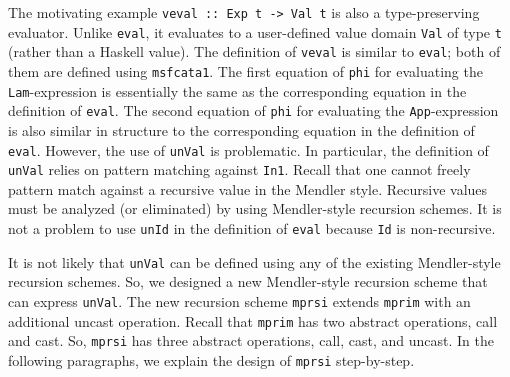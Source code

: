 \begin{figure}

\vspace*{-3ex}
\end{figure}

The motivating example \lstinline{veval :: Exp t -> Val t} is also 
a type-preserving evaluator. Unlike \lstinline{eval}, it evaluates to 
a user-defined value domain \lstinline{Val} of type \lstinline{t} (rather
than a Haskell value). The definition of \lstinline{veval} is similar to
\lstinline{eval}; both of them are defined using \lstinline{msfcata1}.
The first equation of \lstinline{phi} for evaluating
the \lstinline{Lam}-expression is essentially the same as
the corresponding equation in the definition of \lstinline{eval}.
The second equation of \lstinline{phi} for evaluating
the \lstinline{App}-expression is also similar in structure to
the corresponding equation in the definition of \lstinline{eval}.
However, the use of \lstinline{unVal} is problematic. In particular,
the definition of \lstinline{unVal} relies on pattern matching against
\lstinline{In1}. Recall that one cannot freely pattern match against
a recursive value in the Mendler style. Recursive values must be analyzed
(or eliminated) by using Mendler-style recursion schemes. It is not a problem
to use \lstinline{unId} in the definition of \lstinline{eval} because
\lstinline{Id} is non-recursive.

It is not likely that \lstinline{unVal} can be defined using any of
the existing Mendler-style recursion schemes. So, we designed
a new Mendler-style recursion scheme that can express \lstinline{unVal}.
The new recursion scheme \lstinline{mprsi} extends \lstinline{mprim} with
an additional uncast operation. Recall that \lstinline{mprim} has
two abstract operations, call and cast. So, \lstinline{mprsi} has
three abstract operations, call, cast, and uncast. In the following paragraphs,
we explain the design of \lstinline{mprsi} step-by-step.


